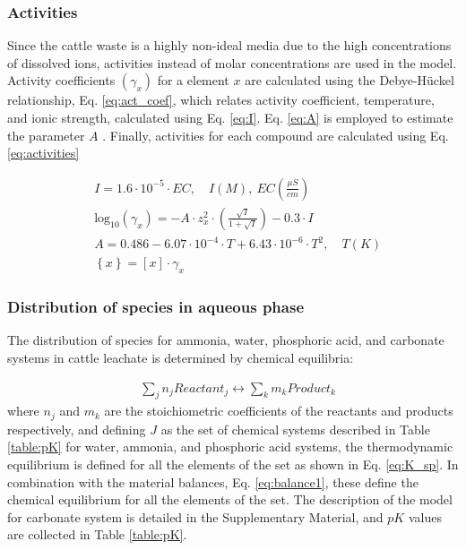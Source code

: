 \documentclass[10pt,a4paper]{article}
\begin{document}
\subsubsection{Activities} \label{Activity coefficients}
Since the cattle waste is a highly non-ideal media due to the high concentrations of dissolved ions, activities instead of molar concentrations are used in the model. Activity coefficients $\left(\gamma_{x}\right)$ for a element $x$ are calculated using the Debye-H\"{u}ckel relationship, Eq. \ref{eq:act_coef}, which relates activity coefficient, temperature, and ionic strength, calculated using Eq. \ref{eq:I}. Eq. \ref{eq:A} is employed to estimate the parameter $A$ . Finally, activities for each compound are calculated using Eq. \ref{eq:activities}

\begin{align}
& I = 1.6 \cdot 10^{-5} \cdot EC, \quad  I \left(  M \right),  \  
EC \left( \frac{\mu S}{cm} \right) \label{eq:I} \\
& \text{log}_\text{10} (\gamma_{x}) =   -A \cdot z_{x}^{2} \cdot \left( \frac{\sqrt{I}} { 1+\sqrt{I}} \right)- 0.3 \cdot I \label{eq:act_coef}\\ 
& A= 0.486-6.07\cdot 10^{-4}  \cdot  T + 6.43\cdot 10^{-6}  \cdot T^{2}, \quad T(K) \label{eq:A}
\\
& \left\{  x \right\} = \left[ x \right] \cdot \gamma_{x} \label{eq:activities}
\end{align}

\subsubsection{Distribution of species in aqueous phase} \label{first_opt_problem}
The distribution of species for ammonia, water, phosphoric acid, and carbonate systems in cattle leachate is determined by chemical equilibria:

\begin{align}
& \sum_{j} n_{j} Reactant_{j}  \leftrightarrow \sum_{k} m_{k} Product_{k}
\end{align}
where $n_{j}$ and $m_{k}$ are the stoichiometric coefficients of the reactants and products respectively, and defining $J$ as the set of chemical systems described in Table \ref{table:pK} for water, ammonia, and phosphoric acid systems, the thermodynamic equilibrium is defined for all the elements of the set as shown in Eq. \ref{eq:K_sp}. In combination with the material balances, Eq. \ref{eq:balance1}, these define the chemical equilibrium for all the elements of the set. The description of the model for carbonate system is detailed in the Supplementary Material, and $pK$ values are collected in Table \ref{table:pK}.
\end{document}
